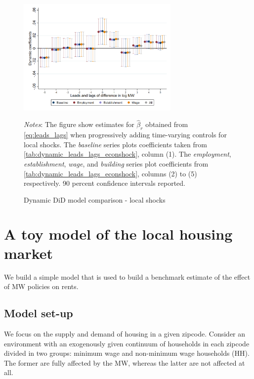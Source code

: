 \begin{figure}[!h]
	\caption{Dynamic DiD model comparison - local shocks}
	\label{fig:}
	\centering
	\includegraphics[width = 0.7\textwidth]{../../analysis/first_differences/output/fd_models_control.png}
	\begin{minipage}{.95\textwidth} \footnotesize
		\vspace{2mm} 
		\textit{Notes}: The figure show estimates for $\hat{\beta}_{r}$ obtained from 
		\autoref{eq:leads_lags} when progressively adding time-varying controls for local shocks. 
		The \textit{baseline} series plots coefficients taken from 
		\autoref{tab:dynamic_leads_lags_econshock}, column (1). The \textit{employment}, 
		\textit{establishment}, \textit{wage}, and \textit{building} series plot coefficients 
		from \autoref{tab:dynamic_leads_lags_econshock}, columns (2) to (5) respectively. 90 
		percent confidence intervals reported.  
	\end{minipage}
\end{figure}

\clearpage
\section{A toy model of the local housing market}\label{sec:model}

We build a simple model that is used to build a benchmark estimate of the effect of MW
policies on rents.

\subsection{Model set-up}

We focus on the supply and demand of housing in a given zipcode. Consider an environment with 
an exogenously given continuum of households in each zipcode divided in two groups: minimum wage 
and non-minimum wage households (HH). The former are fully affected by the MW, whereas the latter 
are not affected at all.


